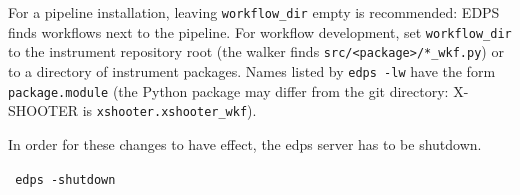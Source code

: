 For a pipeline installation, leaving {\tt workflow\_dir} empty is recommended: EDPS finds workflows next to the pipeline. For workflow development, set {\tt workflow\_dir} to the instrument repository root (the walker finds {\tt src/<package>/*\_wkf.py}) or to a directory of instrument packages. Names listed by {\tt edps -lw} have the form {\tt package.module} (the Python package may differ from the git directory: X-SHOOTER is {\tt xshooter.xshooter\_wkf}).

In order for these changes to have effect, the edps server has to be shutdown.

\verb| edps -shutdown|

